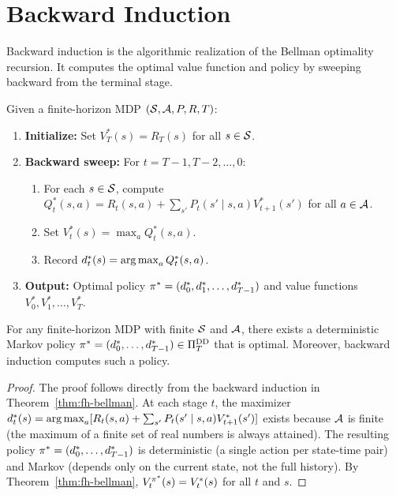 \documentclass[11pt,a4paper]{article}
\begin{document}
\section{Backward Induction}
\label{sec:backward-induction}

Backward induction is the algorithmic realization of the Bellman
optimality recursion. It computes the optimal value function and
policy by sweeping backward from the terminal stage.

\begin{definition}
\label{def:backward-induction}
Given a finite-horizon MDP $(\mathcal{S}, \mathcal{A}, P, R, T)$:
\begin{enumerate}[nosep]
    \item \textbf{Initialize:} Set $V_T^*(s) = R_T(s)$ for all
    $s \in \mathcal{S}$.
    \item \textbf{Backward sweep:} For $t = T-1, T-2, \ldots, 0$:
    \begin{enumerate}[nosep]
        \item For each $s \in \mathcal{S}$, compute
        $Q_t^*(s,a) = R_t(s,a) + \sum_{s'} P_t(s' \mid s,a)
        V_{t+1}^*(s')$ for all $a \in \mathcal{A}$.
        \item Set $V_t^*(s) = \max_{a} Q_t^*(s,a)$.
        \item Record $d_t^*(s) = \operatorname{arg\,max}_{a} Q_t^*(s,a)$.
    \end{enumerate}
    \item \textbf{Output:} Optimal policy
    $\pi^* = (d_0^*, d_1^*, \ldots, d_{T-1}^*)$ and value
    functions $V_0^*, V_1^*, \ldots, V_T^*$.
\end{enumerate}
\end{definition}

\begin{theorem}
\label{thm:fh-det-optimal}
For any finite-horizon MDP with finite $\mathcal{S}$ and $\mathcal{A}$,
there exists a deterministic Markov policy
$\pi^* = (d_0^*, \ldots, d_{T-1}^*) \in \Pi^{\mathrm{DD}}_T$
that is optimal. Moreover, backward induction computes such a policy.
\end{theorem}

\begin{proof}
The proof follows directly from the backward induction in
Theorem~\ref{thm:fh-bellman}. At each stage $t$, the maximizer
$d_t^*(s) = \operatorname{arg\,max}_{a} [R_t(s,a) + \sum_{s'} P_t(s' \mid s,a)
V_{t+1}^*(s')]$ exists because $\mathcal{A}$ is finite (the maximum of
a finite set of real numbers is always attained). The resulting
policy $\pi^* = (d_0^*, \ldots, d_{T-1}^*)$ is deterministic (a
single action per state-time pair) and Markov (depends only on the
current state, not the full history). By
Theorem~\ref{thm:fh-bellman}, $V_t^{\pi^*}(s) = V_t^*(s)$ for
all $t$ and $s$.
\end{proof}
\end{document}
